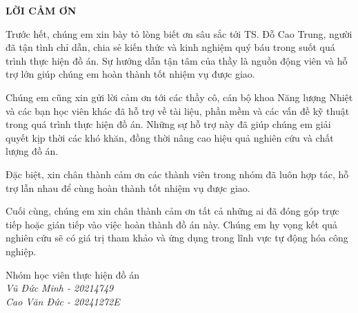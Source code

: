 \documentclass[../main.tex]{subfiles}
\begin{document}
\begin{center}
    \Large{\textbf{LỜI CẢM ƠN}}\\
\end{center}
\vspace{1cm}

Trước hết, chúng em xin bày tỏ lòng biết ơn sâu sắc tới TS. Đỗ Cao Trung, người đã tận tình chỉ dẫn, chia sẻ kiến thức và kinh nghiệm quý báu trong suốt quá trình thực hiện đồ án. Sự hướng dẫn tận tâm của thầy là nguồn động viên và hỗ trợ lớn giúp chúng em hoàn thành tốt nhiệm vụ được giao.

Chúng em cũng xin gửi lời cảm ơn tới các thầy cô, cán bộ khoa Năng lượng Nhiệt và các bạn học viên khác đã hỗ trợ về tài liệu, phần mềm và các vấn đề kỹ thuật trong quá trình thực hiện đồ án. Những sự hỗ trợ này đã giúp chúng em giải quyết kịp thời các khó khăn, đồng thời nâng cao hiệu quả nghiên cứu và chất lượng đồ án.

Đặc biệt, xin chân thành cảm ơn các thành viên trong nhóm đã luôn hợp tác, hỗ trợ lẫn nhau để cùng hoàn thành tốt nhiệm vụ được giao.

Cuối cùng, chúng em xin chân thành cảm ơn tất cả những ai đã đóng góp trực tiếp hoặc gián tiếp vào việc hoàn thành đồ án này. Chúng em hy vọng kết quả nghiên cứu sẽ có giá trị tham khảo và ứng dụng trong lĩnh vực tự động hóa công nghiệp.


\begin{flushright}
Nhóm học viên thực hiện đồ án\\[0.8em]
\textit{Vũ Đức Minh - 20214749}\\
\textit{Cao Văn Đức - 20241272E}\\
\end{flushright}
\end{document}
